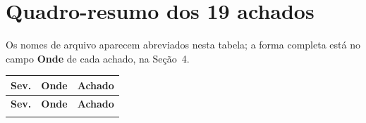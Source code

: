 \documentclass[12pt,a4paper]{article}
\begin{document}
\newpage
\section{Quadro-resumo dos 19 achados}

\noindent Os nomes de arquivo aparecem abreviados nesta tabela; a forma
completa está no campo \textbf{Onde} de cada achado, na Seção~4.

\vspace{0.6em}
\small
\setlength{\tabcolsep}{5pt}
\begin{longtable}{@{}
  >{\raggedright\arraybackslash}p{2.15cm}
  >{\raggedright\arraybackslash}p{4.35cm}
  >{\raggedright\arraybackslash}p{8.7cm}@{}}
\toprule
\textbf{Sev.} & \textbf{Onde} & \textbf{Achado} \\
\midrule
\endfirsthead
\toprule
\textbf{Sev.} & \textbf{Onde} & \textbf{Achado} \\
\midrule
\endhead
\bottomrule
\endfoot


\end{longtable}
\end{document}
